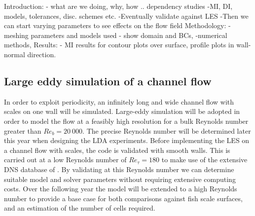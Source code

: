 \documentclass[12pt,oneside,a4paper]{article}
\begin{document}
Introduction: - what are we doing, why, how ..
dependency studies
-MI, DI, models, tolerances, disc. schemes etc. 
-Eventually validate against LES 
-Then we can start varying parameters to see effects on the flow field
Methodology: - meshing parameters and models used
- show domain and BCs,
-numerical methods,
Results: - MI results for contour plots over surface, profile plots in wall-normal direction.



\subsection{Large eddy simulation of a channel flow}
\label{section:les}
In order to exploit periodicity, an infinitely long and wide channel flow with scales on one wall will be simulated. Large-eddy simulation will be adopted in order to model the flow at a feasibly high resolution for a bulk Reynolds number greater than $Re_b = 20\ 000$. The precise Reynolds number will be determined later this year when designing the LDA experiments. Before implementing the LES on a channel flow with scales, the code is validated with smooth walls. This is carried out at a low Reynolds number of $Re_\tau = 180$ to make use of the extensive DNS database of \cite{vreman2014}. By validating at this Reynolds number we can determine suitable model and solver parameters without requiring extensive computing costs. Over the following year the model will be extended to a high Reynolds number to provide a base case for both comparisons against fish scale surfaces, and an estimation of the number of cells required.
\end{document}
